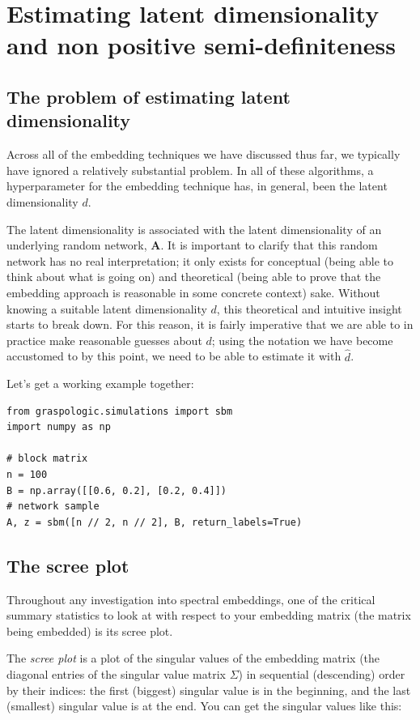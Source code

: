 \section{Estimating latent dimensionality and non positive semi-definiteness}
\label{sec:dimest}

\subsection{The problem of estimating latent dimensionality}
\label{sec:ch6:dimest:dimselect}
Across all of the embedding techniques we have discussed thus far, we typically have ignored a relatively substantial problem. In all of these algorithms, a hyperparameter for the embedding technique has, in general, been the latent dimensionality $d$. 

The latent dimensionality is associated with the latent dimensionality of an underlying random network, $\mathbf A$. It is important to clarify that this random network has no real interpretation; it only exists for conceptual (being able to think about what is going on) and theoretical (being able to prove that the embedding approach is reasonable in some concrete context) sake. Without knowing a suitable latent dimensionality $d$, this theoretical and intuitive insight starts to break down. For this reason, it is fairly imperative that we are able to in practice make reasonable guesses about $d$; using the notation we have become accustomed to by this point, we need to be able to estimate it with $\hat d$. 

Let's get a working example together:

\begin{lstlisting}[style=python]
from graspologic.simulations import sbm
import numpy as np

# block matrix
n = 100
B = np.array([[0.6, 0.2], [0.2, 0.4]])
# network sample
A, z = sbm([n // 2, n // 2], B, return_labels=True)
\end{lstlisting}

\subsection{The scree plot}

Throughout any investigation into spectral embeddings, one of the critical summary statistics to look at with respect to your embedding matrix (the matrix being embedded) is its scree plot. 

The \textit{scree plot} is a plot of the singular values of the embedding matrix (the diagonal entries of the singular value matrix $\Sigma$) in sequential (descending) order by their indices: the first (biggest) singular value is in the beginning, and the last (smallest) singular value is at the end. You can get the singular values like this:

